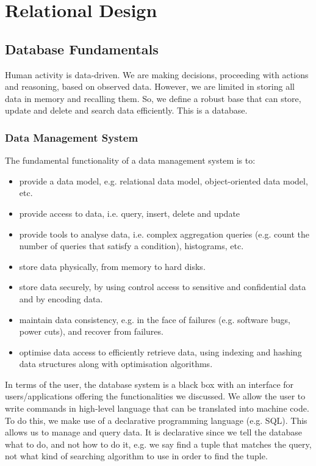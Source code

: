 \documentclass[a4paper, openany]{memoir}
\begin{document}
\chapter{Relational Design}
\section{Database Fundamentals}
Human activity is data-driven. We are making decisions, proceeding with actions and reasoning, based on observed data. However, we are limited in storing all data in memory and recalling them. So, we define a robust base that can store, update and delete and search data efficiently. This is a database.

\subsection{Data Management System}
The fundamental functionality of a data management system is to:
\begin{itemize}
    \item provide a data model, e.g. relational data model, object-oriented data model, etc.
    \item provide access to data, i.e. query, insert, delete and update
    \item provide tools to analyse data, i.e. complex aggregation queries (e.g. count the number of queries that satisfy a condition), histograms, etc.
    \item store data physically, from memory to hard disks.
    \item store data securely, by using control access to sensitive and confidential data and by encoding data.
    \item maintain data consistency, e.g. in the face of failures (e.g. software bugs, power cuts), and recover from failures.
    \item optimise data access to efficiently retrieve data, using indexing and hashing data structures along with optimisation algorithms.
\end{itemize}

In terms of the user, the database system is a black box with an interface for users/applications offering the functionalities we discussed. We allow the user to write commands in high-level language that can be translated into machine code. To do this, we make use of a declarative programming language (e.g. SQL). This allows us to manage and query data. It is declarative since we tell the database what to do, and not how to do it, e.g. we say find a tuple that matches the query, not what kind of searching algorithm to use in order to find the tuple.
\end{document}
